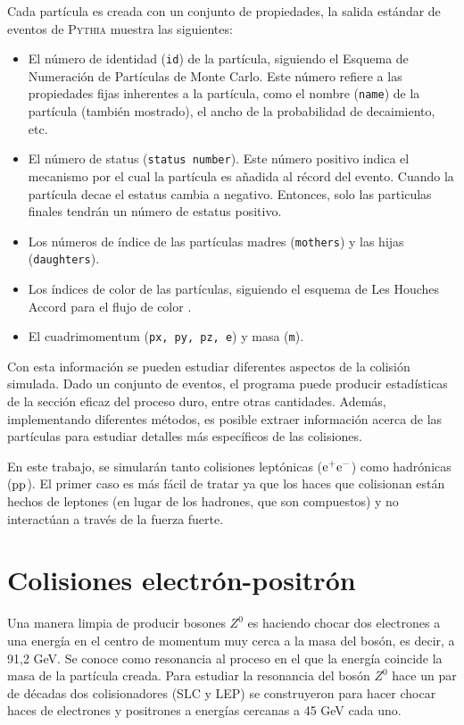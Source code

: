 Cada partícula es creada con un conjunto de propiedades, la salida estándar de eventos de \textsc{Pythia} muestra las siguientes:

\begin{itemize}
\item El número de identidad (\verb|id|) de la partícula, siguiendo el Esquema de Numeración de Partículas de Monte Carlo\cite{Beringer:1900zz}. Este número refiere a las propiedades fijas inherentes a la partícula, como el nombre (\verb|name|) de la partícula (también mostrado), el ancho de la probabilidad de decaimiento, etc.

\item El número de status (\verb|status number|). Este número positivo indica el mecanismo por el cual la partícula es añadida al récord del evento. Cuando la partícula decae el estatus cambia a negativo. Entonces, solo las particulas finales tendrán un número de estatus positivo.

\item Los números de índice de las partículas madres (\verb|mothers|) y las hijas (\verb|daughters|).

\item Los índices de color de las partículas, siguiendo el esquema de Les Houches Accord para el flujo de color \cite{Boos:2001cv}.

\item El cuadrimomentum (\verb|px, py, pz, e|) y masa (\verb|m|).
\end{itemize}

Con esta información se pueden estudiar diferentes aspectos de la colisión simulada. Dado un conjunto de eventos, el programa puede producir estadísticas de la sección eficaz del proceso duro, entre otras cantidades. Además, implementando diferentes métodos, es posible extraer información acerca de las partículas para estudiar detalles más específicos de las colisiones.

En este trabajo, se simularán tanto colisiones leptónicas (${\mathrm e}^+{\mathrm e}^-$) como hadrónicas (${\mathrm p}{\mathrm p}$). El primer caso es más fácil de tratar ya que los haces que colisionan están hechos de leptones (en lugar de los hadrones, que son compuestos) y no interactúan a través de la fuerza fuerte.


\section{Colisiones electrón-positrón}


Una manera limpia de producir bosones $Z^0$ es haciendo chocar dos electrones a una energía en el centro de momentum muy cerca a la masa del bosón, es decir, a 91,2 GeV. Se conoce como resonancia al proceso en el que la energía coincide la masa de la partícula creada. Para estudiar la resonancia del bosón $Z^0$ hace un par de décadas dos colisionadores (SLC y LEP) se construyeron para hacer chocar haces de electrones y positrones a energías cercanas a 45 GeV cada uno.


